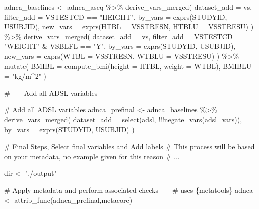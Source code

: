 \documentclass[
  letterpaper,
  DIV=11,
  numbers=noendperiod]{scrreprt}
\newenvironment{Shaded}{\begin{snugshade}}{\end{snugshade}}
\newcommand{\AttributeTok}[1]{\textcolor[rgb]{0.40,0.45,0.13}{#1}}
\newcommand{\CommentTok}[1]{\textcolor[rgb]{0.37,0.37,0.37}{#1}}
\newcommand{\FunctionTok}[1]{\textcolor[rgb]{0.28,0.35,0.67}{#1}}
\newcommand{\NormalTok}[1]{\textcolor[rgb]{0.00,0.23,0.31}{#1}}
\newcommand{\OtherTok}[1]{\textcolor[rgb]{0.00,0.23,0.31}{#1}}
\newcommand{\SpecialCharTok}[1]{\textcolor[rgb]{0.37,0.37,0.37}{#1}}
\newcommand{\StringTok}[1]{\textcolor[rgb]{0.13,0.47,0.30}{#1}}
\begin{document}
\begin{Shaded}
\begin{Highlighting}[]
\NormalTok{adnca\_baselines }\OtherTok{\textless{}{-}}\NormalTok{ adnca\_aseq }\SpecialCharTok{\%\textgreater{}\%}
  \FunctionTok{derive\_vars\_merged}\NormalTok{(}
    \AttributeTok{dataset\_add =}\NormalTok{ vs,}
    \AttributeTok{filter\_add =}\NormalTok{ VSTESTCD }\SpecialCharTok{==} \StringTok{"HEIGHT"}\NormalTok{,}
    \AttributeTok{by\_vars =} \FunctionTok{exprs}\NormalTok{(STUDYID, USUBJID),}
    \AttributeTok{new\_vars =} \FunctionTok{exprs}\NormalTok{(}\AttributeTok{HTBL =}\NormalTok{ VSSTRESN, }\AttributeTok{HTBLU =}\NormalTok{ VSSTRESU)}
\NormalTok{  ) }\SpecialCharTok{\%\textgreater{}\%}
  \FunctionTok{derive\_vars\_merged}\NormalTok{(}
    \AttributeTok{dataset\_add =}\NormalTok{ vs,}
    \AttributeTok{filter\_add =}\NormalTok{ VSTESTCD }\SpecialCharTok{==} \StringTok{"WEIGHT"} \SpecialCharTok{\&}\NormalTok{ VSBLFL }\SpecialCharTok{==} \StringTok{"Y"}\NormalTok{,}
    \AttributeTok{by\_vars =} \FunctionTok{exprs}\NormalTok{(STUDYID, USUBJID),}
    \AttributeTok{new\_vars =} \FunctionTok{exprs}\NormalTok{(}\AttributeTok{WTBL =}\NormalTok{ VSSTRESN, }\AttributeTok{WTBLU =}\NormalTok{ VSSTRESU)}
\NormalTok{  ) }\SpecialCharTok{\%\textgreater{}\%}
  \FunctionTok{mutate}\NormalTok{(}
    \AttributeTok{BMIBL =} \FunctionTok{compute\_bmi}\NormalTok{(}\AttributeTok{height =}\NormalTok{ HTBL, }\AttributeTok{weight =}\NormalTok{ WTBL),}
    \AttributeTok{BMIBLU =} \StringTok{"kg/m\^{}2"}
\NormalTok{  )}

\CommentTok{\# {-}{-}{-}{-} Add all ADSL variables {-}{-}{-}{-}}

\CommentTok{\# Add all ADSL variables}
\NormalTok{adnca\_prefinal }\OtherTok{\textless{}{-}}\NormalTok{ adnca\_baselines }\SpecialCharTok{\%\textgreater{}\%}
  \FunctionTok{derive\_vars\_merged}\NormalTok{(}
    \AttributeTok{dataset\_add =} \FunctionTok{select}\NormalTok{(adsl, }\SpecialCharTok{!!!}\FunctionTok{negate\_vars}\NormalTok{(adsl\_vars)),}
    \AttributeTok{by\_vars =} \FunctionTok{exprs}\NormalTok{(STUDYID, USUBJID)}
\NormalTok{  )}

\CommentTok{\# Final Steps, Select final variables and Add labels}
\CommentTok{\# This process will be based on your metadata, no example given for this reason}
\CommentTok{\# ...}

\NormalTok{dir }\OtherTok{\textless{}{-}} \StringTok{"./output"}

\CommentTok{\# Apply metadata and perform associated checks {-}{-}{-}{-}}
\CommentTok{\# uses \{metatools\}}
\NormalTok{adnca }\OtherTok{\textless{}{-}} \FunctionTok{attrib\_func}\NormalTok{(adnca\_prefinal,metacore)}


\end{Highlighting}
\end{Shaded}
\end{document}
